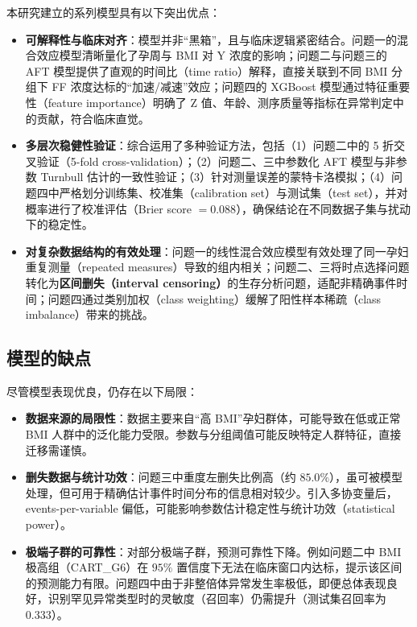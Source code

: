 \documentclass[withoutpreface]{cumcmthesis}
\begin{document}
本研究建立的系列模型具有以下突出优点：
\begin{itemize}
    \item \textbf{可解释性与临床对齐}：模型并非“黑箱”，且与临床逻辑紧密结合。问题一的混合效应模型清晰量化了孕周与 BMI 对 Y 浓度的影响；问题二与问题三的 AFT 模型提供了直观的时间比（time ratio）解释，直接关联到不同 BMI 分组下 FF 浓度达标的“加速/减速”效应；问题四的 XGBoost 模型通过特征重要性（feature importance）明确了 Z 值、年龄、测序质量等指标在异常判定中的贡献，符合临床直觉。
    \item \textbf{多层次稳健性验证}：综合运用了多种验证方法，包括（1）问题二中的 5 折交叉验证（5-fold cross-validation）；（2）问题二、三中参数化 AFT 模型与非参数 Turnbull 估计的一致性验证；（3）针对测量误差的蒙特卡洛模拟；（4）问题四中严格划分训练集、校准集（calibration set）与测试集（test set），并对概率进行了校准评估（Brier score $=0.088$），确保结论在不同数据子集与扰动下的稳定性。
    \item \textbf{对复杂数据结构的有效处理}：问题一的线性混合效应模型有效处理了同一孕妇重复测量（repeated measures）导致的组内相关；问题二、三将时点选择问题转化为\textbf{区间删失（interval censoring）}的生存分析问题，适配非精确事件时间；问题四通过类别加权（class weighting）缓解了阳性样本稀疏（class imbalance）带来的挑战。
\end{itemize}

\subsection{模型的缺点}

尽管模型表现优良，仍存在以下局限：
\begin{itemize}
    \item \textbf{数据来源的局限性}：数据主要来自“高 BMI”孕妇群体，可能导致在低或正常 BMI 人群中的泛化能力受限。参数与分组阈值可能反映特定人群特征，直接迁移需谨慎。
    \item \textbf{删失数据与统计功效}：问题三中重度左删失比例高（约 $85.0\%$），虽可被模型处理，但可用于精确估计事件时间分布的信息相对较少。引入多协变量后，events-per-variable 偏低，可能影响参数估计稳定性与统计功效（statistical power）。
    \item \textbf{极端子群的可靠性}：对部分极端子群，预测可靠性下降。例如问题二中 BMI 极高组（CART\_G6）在 $95\%$ 置信度下无法在临床窗口内达标，提示该区间的预测能力有限。问题四中由于非整倍体异常发生率极低，即便总体表现良好，识别罕见异常类型时的灵敏度（召回率）仍需提升（测试集召回率为 $0.333$）。
\end{itemize}
\end{document}
